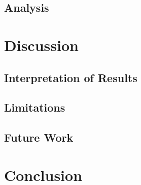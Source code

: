 \documentclass[11pt,a4paper]{article}
\begin{document}
\subsection{Analysis}
\label{subsec:analysis}


\section{Discussion}
\label{sec:discussion}


\subsection{Interpretation of Results}
\label{subsec:interpretation}


\subsection{Limitations}
\label{subsec:limitations}


\subsection{Future Work}
\label{subsec:future_work}


\section{Conclusion}
\label{sec:conclusion}
\end{document}
